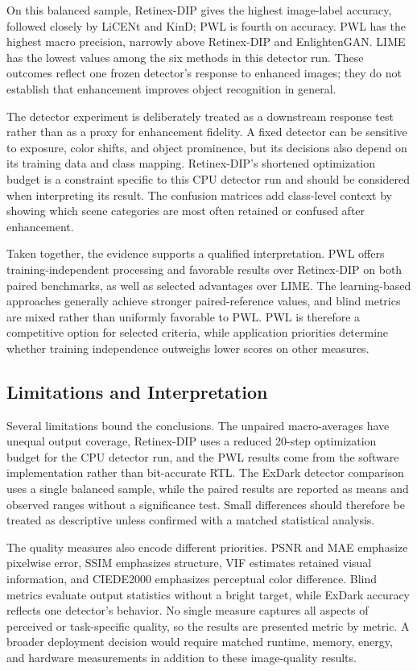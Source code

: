 \documentclass[conference]{IEEEtran}
\begin{document}
On this balanced sample, Retinex-DIP gives the highest image-label accuracy, followed closely by LiCENt and KinD; PWL is fourth on accuracy. PWL has the highest macro precision, narrowly above Retinex-DIP and EnlightenGAN. LIME has the lowest values among the six methods in this detector run. These outcomes reflect one frozen detector's response to enhanced images; they do not establish that enhancement improves object recognition in general.

The detector experiment is deliberately treated as a downstream response test rather than as a proxy for enhancement fidelity. A fixed detector can be sensitive to exposure, color shifts, and object prominence, but its decisions also depend on its training data and class mapping. Retinex-DIP's shortened optimization budget is a constraint specific to this CPU detector run and should be considered when interpreting its result. The confusion matrices add class-level context by showing which scene categories are most often retained or confused after enhancement.

Taken together, the evidence supports a qualified interpretation. PWL offers training-independent processing and favorable results over Retinex-DIP on both paired benchmarks, as well as selected advantages over LIME. The learning-based approaches generally achieve stronger paired-reference values, and blind metrics are mixed rather than uniformly favorable to PWL. PWL is therefore a competitive option for selected criteria, while application priorities determine whether training independence outweighs lower scores on other measures.

\subsection{Limitations and Interpretation}

Several limitations bound the conclusions. The unpaired macro-averages have unequal output coverage, Retinex-DIP uses a reduced 20-step optimization budget for the CPU detector run, and the PWL results come from the software implementation rather than bit-accurate RTL. The ExDark detector comparison uses a single balanced sample, while the paired results are reported as means and observed ranges without a significance test. Small differences should therefore be treated as descriptive unless confirmed with a matched statistical analysis.

The quality measures also encode different priorities. PSNR and MAE emphasize pixelwise error, SSIM emphasizes structure, VIF estimates retained visual information, and CIEDE2000 emphasizes perceptual color difference. Blind metrics evaluate output statistics without a bright target, while ExDark accuracy reflects one detector's behavior. No single measure captures all aspects of perceived or task-specific quality, so the results are presented metric by metric. A broader deployment decision would require matched runtime, memory, energy, and hardware measurements in addition to these image-quality results.
\end{document}
